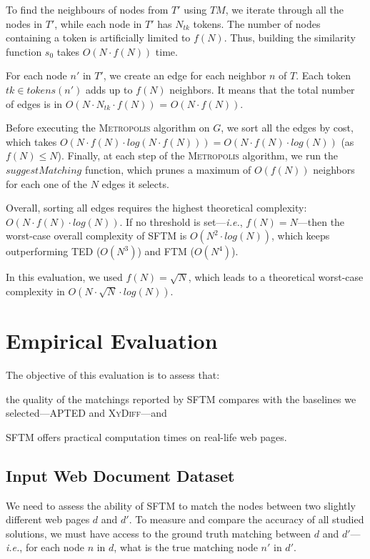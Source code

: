 To find the neighbours of nodes from $T'$ using $TM$, we iterate through all the nodes in $T'$, while each node in $T'$ has $N_{tk}$ tokens.
The number of nodes containing a token is artificially limited to $f(N)$.
Thus, building the similarity function $s_0$ takes $O(N \cdot f(N))$ time.

For each node $n'$ in $T'$, we create an edge for each neighbor $n$ of $T$.
Each token $tk \in tokens(n')$ adds up to $f(N)$ neighbors.
It means that the total number of edges is in $O(N \cdot N_{tk} \cdot f(N))$ = $O(N \cdot f(N))$.

Before executing the \textsc{Metropolis} algorithm on $G$, we sort all the edges by cost, which takes $O(N \cdot f(N) \cdot log(N \cdot f(N))) = O(N \cdot f(N) \cdot log(N))$ (as $f(N) \leq N$).
Finally, at each step of the \textsc{Metropolis} algorithm, we run the $suggestMatching$ function, which prunes a maximum of $O(f(N))$ neighbors for each one of the $N$ edges it selects.

Overall, sorting all edges requires the highest theoretical complexity: $O(N \cdot f(N) \cdot log(N))$.
If no threshold is set---\emph{i.e.}, $f(N) = N$---then the worst-case overall complexity of SFTM is $O(N^2 \cdot log(N))$, which keeps outperforming TED ($O(N^3)$) and FTM ($O(N^4)$).

In this evaluation, we used $f(N) = \sqrt{N}$, which leads to a theoretical worst-case complexity in $O(N \cdot \sqrt{N} \cdot log(N))$.

\section{Empirical Evaluation}\label{sftm:sec:evaluation}
The objective of this evaluation is to assess that:
\begin{compactenum}
	\item the quality of the matchings reported by SFTM compares with the baselines we selected---APTED and \textsc{XyDiff}---and
    \item SFTM offers practical computation times on real-life web pages.
\end{compactenum}

\subsection{Input Web Document Dataset}
We need to assess the ability of SFTM to match the nodes between two slightly different web pages $d$ and $d'$.
To measure and compare the accuracy of all studied solutions, we must have access to the ground truth matching between $d$ and $d'$---\emph{i.e.}, for each node $n$ in $d$, what is the true matching node $n'$ in $d'$.

